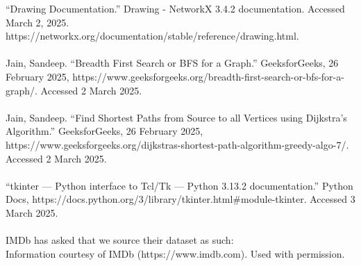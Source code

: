 \documentclass{article}
\begin{document}
“Drawing Documentation.” Drawing - NetworkX 3.4.2 documentation. Accessed March 2, 2025. https://networkx.org/documentation/stable/reference/drawing.html.\\\\

Jain, Sandeep. “Breadth First Search or BFS for a Graph.” GeeksforGeeks, 26 February 2025, https://www.geeksforgeeks.org/breadth-first-search-or-bfs-for-a-graph/. Accessed 2 March 2025.\\\\

Jain, Sandeep. “Find Shortest Paths from Source to all Vertices using Dijkstra's Algorithm.” GeeksforGeeks, 26 February 2025, https://www.geeksforgeeks.org/dijkstras-shortest-path-algorithm-greedy-algo-7/. Accessed 2 March 2025.\\\\

“tkinter — Python interface to Tcl/Tk — Python 3.13.2 documentation.” Python Docs, https://docs.python.org/3/library/tkinter.html\#module-tkinter. Accessed 3 March 2025.\\\\




IMDb has asked that we source their dataset as such:\\
Information courtesy of
IMDb
(https://www.imdb.com).
Used with permission.
\end{document}
